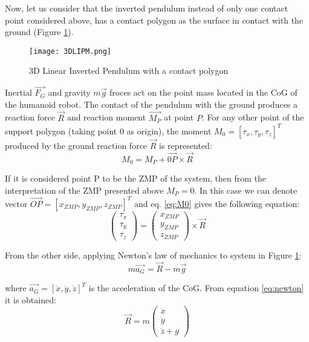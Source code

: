 Now, let us consider that the inverted pendulum instead of only one contact point considered above, has a contact polygon as the surface in contact with the ground (Figure \ref{fig:3DLIPM}).

\begin{figure}[!hbt]
\centering
\texttt{[image: 3DLIPM.png]}
\caption{3D Linear Inverted Pendulum with a contact polygon \protect\cite{Kaynov2008} }
\label{fig:3DLIPM}
\end{figure}

Inertial $\overrightarrow{F_G}$ and gravity $m\overrightarrow{g}$ froces act on the point mass located in the CoG of the humanoid robot. The contact of the pendulum with the ground produces a reaction force $\overrightarrow{R}$ and reaction moment $\overrightarrow{M_P}$ at point $P$. For any other point of the support polygon (taking point 0 as origin), the moment $M_0=[\tau_x, \tau_y, \tau_z]^T$ produced by the ground reaction force $\overrightarrow{R}$ is represented: 
\begin{equation}
M_0 = M_P + \overrightarrow{0P} \times \overrightarrow{R}
\label{eq:M0}
\end{equation}

If it is considered point P to be the ZMP of the system, then from the interpretation of the ZMP presented above $M_P = 0$. In this case we can denote vector $\overrightarrow{OP} = [x_{ZMP}, y_{ZMP}, z_{ZMP}]^T$ and eq. \eqref{eq:M0} gives the following equation:
\begin{equation}
\begin{pmatrix}
\tau_x \\
\tau_y \\
\tau_z 
\end{pmatrix} 
=
\begin{pmatrix}
x_{ZMP} \\
y_{ZMP} \\
z_{ZMP}
\end{pmatrix}
\times \overrightarrow{R}
\label{eq:1}
\end{equation}

From the other side, applying Newton’s law of mechanics to system in Figure \ref{fig:3DLIPM}:
\begin{equation}
m \overrightarrow{a_G} = \overrightarrow{R} - m\overrightarrow{g}
\label{eq:newton}
\end{equation}

where $\overrightarrow{a_G} = [\ddot{x}, \ddot{y}, \ddot{z}]^T$ is the acceleration of the CoG. From equation \eqref{eq:newton} it is obtained:
\begin{equation}
\overrightarrow{R} = m 
\begin{pmatrix}
\ddot{x} \\
\ddot{y} \\
\ddot{z} + g
\end{pmatrix}
\label{eq:2}
\end{equation}

